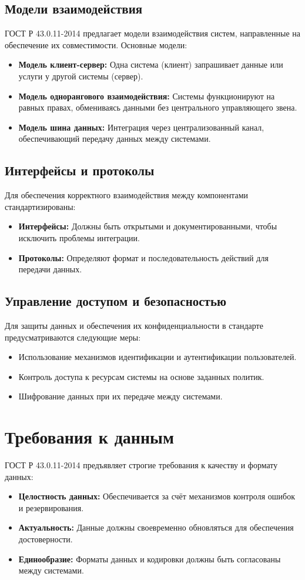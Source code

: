 \subsection*{Модели взаимодействия}
ГОСТ Р 43.0.11-2014 предлагает модели взаимодействия систем, направленные на обеспечение их совместимости. Основные модели:
\begin{itemize}
    \item \textbf{Модель клиент-сервер:} Одна система (клиент) запрашивает данные или услуги у другой системы (сервер).
    \item \textbf{Модель однорангового взаимодействия:} Системы функционируют на равных правах, обмениваясь данными без центрального управляющего звена.
    \item \textbf{Модель шина данных:} Интеграция через централизованный канал, обеспечивающий передачу данных между системами.
\end{itemize}

\subsection*{Интерфейсы и протоколы}
Для обеспечения корректного взаимодействия между компонентами стандартизированы:
\begin{itemize}
    \item \textbf{Интерфейсы:} Должны быть открытыми и документированными, чтобы исключить проблемы интеграции.
    \item \textbf{Протоколы:} Определяют формат и последовательность действий для передачи данных.
\end{itemize}

\subsection*{Управление доступом и безопасностью}
Для защиты данных и обеспечения их конфиденциальности в стандарте предусматриваются следующие меры:
\begin{itemize}
    \item Использование механизмов идентификации и аутентификации пользователей.
    \item Контроль доступа к ресурсам системы на основе заданных политик.
    \item Шифрование данных при их передаче между системами.
\end{itemize}

\section*{Требования к данным}
ГОСТ Р 43.0.11-2014 предъявляет строгие требования к качеству и формату данных:
\begin{itemize}
    \item \textbf{Целостность данных:} Обеспечивается за счёт механизмов контроля ошибок и резервирования.
    \item \textbf{Актуальность:} Данные должны своевременно обновляться для обеспечения достоверности.
    \item \textbf{Единообразие:} Форматы данных и кодировки должны быть согласованы между системами.
\end{itemize}

